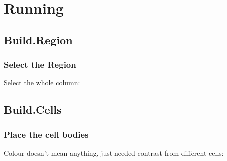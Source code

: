 \documentclass{beamer}
\begin{document}
\section{Running}
\subsection{Build.Region}
\begin{frame}
  \frametitle{Select the Region}
  Select the whole column:

\end{frame}

\subsection{Build.Cells}
\begin{frame}
  \frametitle{Place the cell bodies}
  Colour doesn't mean anything, just needed contrast from different cells:

\end{frame}
\end{document}
